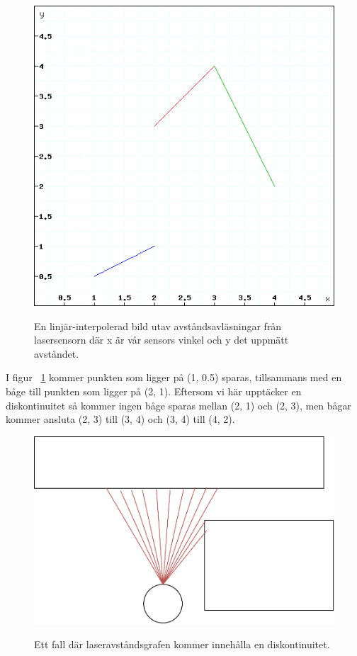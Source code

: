 \documentclass{article}
\begin{document}
\begin{figure}[H]
  \centering
  \includegraphics[scale=0.5]{Laserfunktionskurva} \\
  \caption{En linjär-interpolerad bild utav avståndsavläsningar från lasersensorn där x är vår sensors vinkel och y det uppmätt avståndet.}
  \label{fig:laserfunktionskurva}
\end{figure}

I figur ~\ref{fig:laserfunktionskurva} kommer punkten som ligger på (1, 0.5) sparas, tillsammans med en båge till punkten som ligger på (2, 1). Eftersom vi här upptäcker en diskontinuitet så kommer ingen båge sparas mellan (2, 1) och (2, 3), men bågar kommer ansluta (2, 3) till (3, 4) och (3, 4) till (4, 2).

\begin{figure}[H]
  \centering
  \includegraphics[scale=0.5,keepaspectratio]{LaserDiskontinuitet} \\
  \caption{Ett fall där laseravståndsgrafen kommer innehålla en diskontinuitet.}
  \label{fig:LaserDiskontinuitet}
\end{figure}
\end{document}
